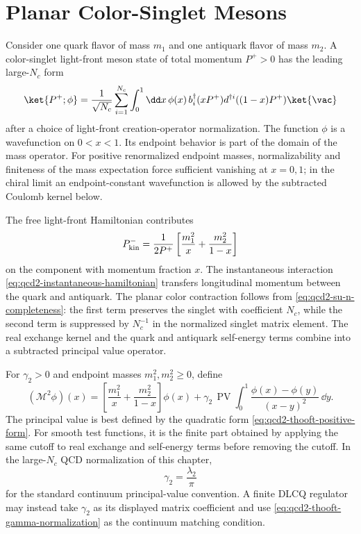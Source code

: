 \section{Planar Color-Singlet Mesons}

Consider one quark flavor of mass \(m_1\) and one antiquark flavor of mass
\(m_2\).  A color-singlet light-front meson state of total momentum \(P^+>0\)
has the leading large-\(N_c\) form
\begin{equation}
  \ket{P^+;\phi}
  =
  \frac1{\sqrt{N_c}}
  \sum_{i=1}^{N_c}
  \int_0^1\dd x\,
  \phi(x)\,
  b_i^\dagger(xP^+)d^{\dagger i}((1-x)P^+)\ket{\vac}
  \label{eq:qcd2-meson-state}
\end{equation}
after a choice of light-front creation-operator normalization.  The function
\(\phi\) is a wavefunction on \(0<x<1\).  Its endpoint behavior is part of
the domain of the mass operator.  For positive renormalized endpoint masses,
normalizability and finiteness of the mass expectation force sufficient
vanishing at \(x=0,1\); in the chiral limit an endpoint-constant wavefunction
is allowed by the subtracted Coulomb kernel below.

The free light-front Hamiltonian contributes
\[
  P^-_{\rm kin}
  =
  \frac1{2P^+}
  \left[
    \frac{m_1^2}{x}+\frac{m_2^2}{1-x}
  \right]
\]
on the component with momentum fraction \(x\).  The instantaneous interaction
\eqref{eq:qcd2-instantaneous-hamiltonian} transfers longitudinal momentum
between the quark and antiquark.  The planar color contraction follows from
\eqref{eq:qcd2-su-n-completeness}: the first term preserves the singlet with
coefficient \(N_c\), while the second term is suppressed by \(N_c^{-1}\) in
the normalized singlet matrix element.  The real exchange kernel and the
quark and antiquark self-energy terms combine into a subtracted principal
value operator.

\begin{definition}
\label{def:qcd2-subtracted-thooft-operator}
For \(\gamma_2>0\) and endpoint masses \(m_1^2,m_2^2\geq0\), define
\begin{equation}
  (\mathcal M^2\phi)(x)
  =
  \left[
    \frac{m_1^2}{x}
    +
    \frac{m_2^2}{1-x}
  \right]\phi(x)
  +
  \gamma_2\,
  \operatorname{PV}\int_0^1
  \frac{\phi(x)-\phi(y)}{(x-y)^2}\,\dd y .
  \label{eq:qcd2-subtracted-thooft-operator}
\end{equation}
The principal value is best defined by the quadratic form
\eqref{eq:qcd2-thooft-positive-form}.  For smooth test functions,
it is the finite part obtained by applying the same cutoff to real exchange
and self-energy terms before removing the cutoff.  In the large-\(N_c\) QCD
normalization of this chapter,
\begin{equation}
  \gamma_2=\frac{\lambda_2}{\pi}
  \label{eq:qcd2-thooft-gamma-normalization}
\end{equation}
for the standard continuum principal-value convention.  A finite DLCQ
regulator may instead take \(\gamma_2\) as its displayed matrix coefficient
and use \eqref{eq:qcd2-thooft-gamma-normalization} as the continuum matching
condition.
\end{definition}

